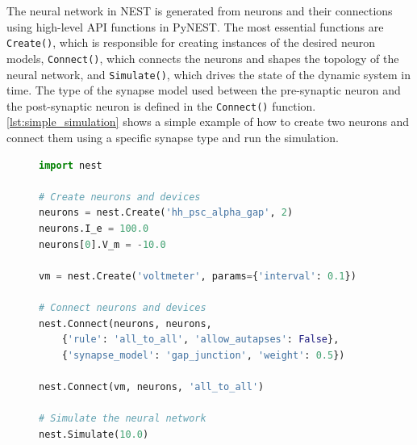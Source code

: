 The neural network in NEST is generated from neurons and their connections using high-level API functions in PyNEST. The most essential functions are \texttt{Create()}, which is responsible for creating instances of the desired neuron models, \texttt{Connect()}, which connects the neurons and shapes the topology of the neural network, and \texttt{Simulate()}, which drives the state of the dynamic system in time. The type of the synapse model used between the pre-synaptic neuron and the post-synaptic neuron is defined in the \texttt{Connect()} function. \autoref{lst:simple_simulation} shows a simple example of how to create two neurons and connect them using a specific synapse type and run the simulation.\\

\begin{figure}[ht!]
  \centering
\begin{lstlisting}[language=Python, label=lst:simple_simulation, caption={Every simulation script using PyNEST starts with importing the \texttt{nest} module in Python. In line 4, we create two Hodgkin-Huxley neurons as instances of the \emph{hh\_psc\_alpha\_gap} model. In line 5, we set a background current of 100.0 pA for both neurons. Line 6 modifies the initial membrane potentials of the first neuron instance to be at -10.0 mV. In line 8, we create a \texttt{voltmeter} to record the membrane potential of both neurons. In line 11, we connect the first neuron with the second neuron, and vice-versa using the \emph{gap\_junction} synapse model. Finally, we connect the voltmeter to the neurons to record their membrane potential over the course of the simulation in line 15 and run the simulation for 10.0 milliseconds in the last line by calling \texttt{Simulate()}.}, captionpos=b]
import nest

# Create neurons and devices
neurons = nest.Create('hh_psc_alpha_gap', 2)
neurons.I_e = 100.0
neurons[0].V_m = -10.0

vm = nest.Create('voltmeter', params={'interval': 0.1})

# Connect neurons and devices
nest.Connect(neurons, neurons,
    {'rule': 'all_to_all', 'allow_autapses': False},
    {'synapse_model': 'gap_junction', 'weight': 0.5})

nest.Connect(vm, neurons, 'all_to_all')

# Simulate the neural network
nest.Simulate(10.0)
\end{lstlisting}
\end{figure}

